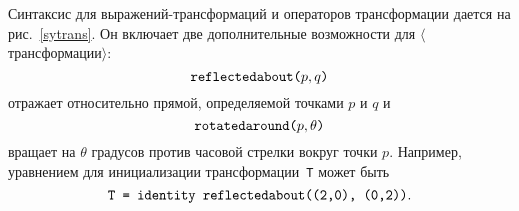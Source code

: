 \documentclass{article} %
\newcommand\invisgap{\nobreak\hskip0pt\relax}
\newcommand\tdescr[1]{$\langle$\invisgap#1\invisgap$\rangle$}
\begin{document}
Синтаксис для выражений-трансформаций и операторов трансформации дается на 
рис.~\ref{sytrans}.
Он включает две дополнительные возможности для 
\tdescr{трансформации}:
$$ \hbox{\tt reflectedabout(}p, q\hbox{\tt )} $$
отражает относительно прямой, определяемой точками $p$ и $q$ 
и
$$ \hbox{\tt rotatedaround(}p,\theta\hbox{\tt )} $$
вращает на $\theta$ градусов против часовой стрелки вокруг точки $p$. 
Например, уравнением для инициализации трансформации~{\tt T} может быть 
$$ \hbox{\tt T = identity reflectedabout((2,0), (0,2))}. $$
\end{document}
